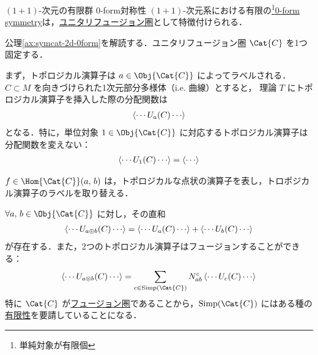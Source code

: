 \documentclass[TQFT_main]{subfiles}
\begin{document}
\begin{myaxiom}[label=ax:symcat-2d-0form]{$(1+1)$-次元の有限群 $0$-form対称性}
    $(1+1)$-次元系における有限の\footnote{単純対象が有限個}\hyperref[def:p-form-sym]{0-form symmetry}は，\hyperref[def:tensorfusion-cat]{ユニタリフュージョン圏}として特徴付けられる．
\end{myaxiom}

公理\ref{ax:symcat-2d-0form}を解読する．ユニタリフュージョン圏 $\Cat{C}$ を1つ固定する．

まず，トポロジカル演算子は $a \in \Obj{\Cat{C}}$ によってラベルされる．$C \subset M$ を向きづけられた1次元部分多様体（i.e. 曲線）とすると，
理論 $T$ にトポロジカル演算子を挿入した際の分配関数は
\begin{align}
    \expval{\cdots U_a (C) \cdots}
\end{align}
となる．特に，単位対象 $1 \in \Obj{\Cat{C}}$ に対応するトポロジカル演算子は分配関数を変えない：
\begin{align}
    \expval{\cdots U_1 (C) \cdots} = \expval{\cdots}
\end{align}

$f \in \Hom{\Cat{C}}(a,\, b)$ は，トポロジカルな点状の演算子を表し，トロポジカル演算子のラベルを取り替える．
\begin{center}
\end{center}

$\forall a,\, b \in \Obj{\Cat{C}}$ に対し，その直和
\begin{align}
    \expval{\cdots U_{a \oplus b} (C) \cdots} = \expval{\cdots U_a (C) \cdots} + \expval{\cdots U_b(C) \cdots}
\end{align}
が存在する．また，2つのトポロジカル演算子はフュージョンすることができる：
\begin{align}
    \expval{\cdots U_{a \otimes b} (C) \cdots} = \sum_{c \in \mathrm{Simp}(\Cat{C})} N^c_{ab} \expval{\cdots U_c (C) \cdots}
\end{align}
特に $\Cat{C}$ が\hyperref[def:tensorfusion-cat]{フュージョン圏}であることから，$\mathrm{Simp}(\Cat{C})$ にはある種の\hyperref[def:finite-abcat]{有限性}を要請していることになる．
\end{document}
